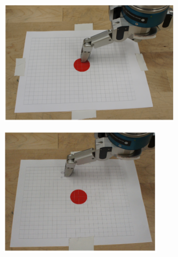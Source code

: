 \begin{figure}[width=1.0\textwidth]
\centering
\begin{subfigure}{0.4\textwidth}
	\includegraphics[width=1.0\textwidth]{img/dense_tracking/track_touch}
	\caption{}
\end{subfigure}
\begin{subfigure}{0.4\textwidth}
	\includegraphics[width=0.9\textwidth]{img/dense_tracking/openloop_touch}
	\caption{}
\end{subfigure}
	\begin{subfigure}{0.5\textwidth}

\end{subfigure}
\end{figure}
